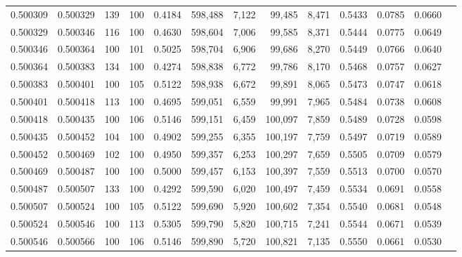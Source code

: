 \begin{tabular}{rrrrrrrrrrrrr}
0.500309 & 0.500329 &   139 & 100 &                                     0.4184 & 598,488 &   7,122 &  99,485 &   8,471 & 0.5433 & 0.0785 & 0.0660 \\
0.500329 & 0.500346 &   116 & 100 &                                     0.4630 & 598,604 &   7,006 &  99,585 &   8,371 & 0.5444 & 0.0775 & 0.0649 \\
0.500346 & 0.500364 &   100 & 101 &                                     0.5025 & 598,704 &   6,906 &  99,686 &   8,270 & 0.5449 & 0.0766 & 0.0640 \\
0.500364 & 0.500383 &   134 & 100 &                                     0.4274 & 598,838 &   6,772 &  99,786 &   8,170 & 0.5468 & 0.0757 & 0.0627 \\
0.500383 & 0.500401 &   100 & 105 &                                     0.5122 & 598,938 &   6,672 &  99,891 &   8,065 & 0.5473 & 0.0747 & 0.0618 \\
0.500401 & 0.500418 &   113 & 100 &                                     0.4695 & 599,051 &   6,559 &  99,991 &   7,965 & 0.5484 & 0.0738 & 0.0608 \\
0.500418 & 0.500435 &   100 & 106 &                                     0.5146 & 599,151 &   6,459 & 100,097 &   7,859 & 0.5489 & 0.0728 & 0.0598 \\
0.500435 & 0.500452 &   104 & 100 &                                     0.4902 & 599,255 &   6,355 & 100,197 &   7,759 & 0.5497 & 0.0719 & 0.0589 \\
0.500452 & 0.500469 &   102 & 100 &                                     0.4950 & 599,357 &   6,253 & 100,297 &   7,659 & 0.5505 & 0.0709 & 0.0579 \\
0.500469 & 0.500487 &   100 & 100 &                                     0.5000 & 599,457 &   6,153 & 100,397 &   7,559 & 0.5513 & 0.0700 & 0.0570 \\
0.500487 & 0.500507 &   133 & 100 &                                     0.4292 & 599,590 &   6,020 & 100,497 &   7,459 & 0.5534 & 0.0691 & 0.0558 \\
0.500507 & 0.500524 &   100 & 105 &                                     0.5122 & 599,690 &   5,920 & 100,602 &   7,354 & 0.5540 & 0.0681 & 0.0548 \\
0.500524 & 0.500546 &   100 & 113 &                                     0.5305 & 599,790 &   5,820 & 100,715 &   7,241 & 0.5544 & 0.0671 & 0.0539 \\
0.500546 & 0.500566 &   100 & 106 &                                     0.5146 & 599,890 &   5,720 & 100,821 &   7,135 & 0.5550 & 0.0661 & 0.0530 \\

\end{tabular}
